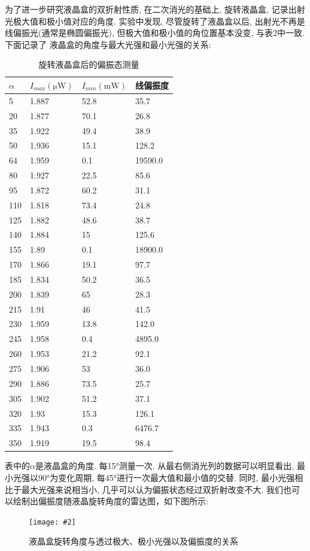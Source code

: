 \documentclass[12pt,a4paper]{article}
\newcommand{\bfig}[3]{
    \begin{figure}[H]
        \centering
        \texttt{[image: \#2]}
        \caption{#3}
    \end{figure}
}
\begin{document}
为了进一步研究液晶盒的双折射性质, 在二次消光的基础上, 旋转液晶盒, 记录出射光极大值和极小值对应的角度. 
实验中发现, 尽管旋转了液晶盒以后, 出射光不再是线偏振光(通常是椭圆偏振光), 但极大值和极小值的角位置基本没变, 与表2中一致. 下面记录了
液晶盒的角度与最大光强和最小光强的关系:
\begin{table}[H]
\centering
\begin{tabular}{|l|l|l|l|}
\hline
$\alpha$&$I_{max} (\unit{\micro\watt})$&$I_{min}(\unit{\milli\watt})$&线偏振度\\ \hline
5&1.887&52.8&35.7 \\
20&1.877&70.1&26.8 \\
35&1.922&49.4&38.9 \\
50&1.936&15.1&128.2 \\
64&1.959&0.1&19590.0 \\
80&1.927&22.5&85.6 \\
95&1.872&60.2&31.1 \\
110&1.818&73.4&24.8 \\
125&1.882&48.6&38.7 \\
140&1.884&15&125.6 \\
155&1.89&0.1&18900.0 \\
170&1.866&19.1&97.7 \\
185&1.834&50.2&36.5 \\
200&1.839&65&28.3 \\
215&1.91&46&41.5 \\
230&1.959&13.8&142.0 \\
245&1.958&0.4&4895.0 \\
260&1.953&21.2&92.1 \\
275&1.906&53&36.0 \\
290&1.886&73.5&25.7 \\
305&1.902&51.2&37.1 \\
320&1.93&15.3&126.1 \\
335&1.943&0.3&6476.7 \\
350&1.919&19.5&98.4 \\
\hline
\end{tabular}
\caption{旋转液晶盒后的偏振态测量}
\end{table}


表中的$\alpha$是液晶盒的角度. 每15°测量一次. 从最右侧消光列的数据可以明显看出, 最小光强以90°为变化周期, 每45°进行一次最大值和最小值的交替. 同时, 
最小光强相比于最大光强来说相当小, 几乎可以认为偏振状态经过双折射改变不大. 我们也可以绘制出偏振度随液晶旋转角度的雷达图，如下图所示:
\bfig{0.8}{polarization.png}{液晶盒旋转角度与透过极大、极小光强以及偏振度的关系}
\end{document}
